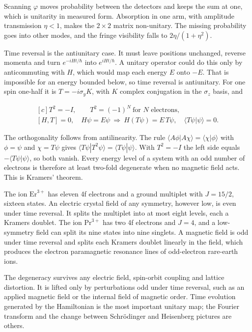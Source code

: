 \documentclass[11pt,oneside]{book}
\newenvironment{centeredalign}{\[\begin{gathered}[c]}{\end{gathered}\]}
\begin{document}
Scanning \(\varphi\) moves probability between the detectors and keeps the sum at one, which is unitarity in measured form. Absorption in one arm, with amplitude transmission \(\eta<1\), makes the \(2\times2\) matrix non-unitary. The missing probability goes into other modes, and the fringe visibility falls to \(2\eta/(1+\eta^2)\).

Time reversal is the antiunitary case. It must leave positions unchanged, reverse momenta and turn \(e^{-iHt/\hbar}\) into \(e^{iHt/\hbar}\). A unitary operator could do this only by anticommuting with \(H\), which would map each energy \(E\) onto \(-E\). That is impossible for an energy bounded below, so time reversal is antiunitary. For one spin one-half it is \(T=-i\sigma_yK\), with \(K\) complex conjugation in the \(\sigma_z\) basis, and

\begin{centeredalign}
T^2=-I,\qquad T^2=(-1)^N\ \text{for }N\text{ electrons},\\
[H,T]=0,\quad H\psi=E\psi\ \Longrightarrow\ H(T\psi)=E\,T\psi,\quad \langle T\psi|\psi\rangle=0.
\end{centeredalign}

The orthogonality follows from antilinearity. The rule \(\langle A\phi|A\chi\rangle=\langle\chi|\phi\rangle\) with \(\phi=\psi\) and \(\chi=T\psi\) gives \(\langle T\psi|T^2\psi\rangle=\langle T\psi|\psi\rangle\). With \(T^2=-I\) the left side equals \(-\langle T\psi|\psi\rangle\), so both vanish. Every energy level of a system with an odd number of electrons is therefore at least two-fold degenerate when no magnetic field acts. This is Kramers' theorem.

The ion \(\mathrm{Er}^{3+}\) has eleven 4f electrons and a ground multiplet with \(J=15/2\), sixteen states. An electric crystal field of any symmetry, however low, is even under time reversal. It splits the multiplet into at most eight levels, each a Kramers doublet. The ion \(\mathrm{Pr}^{3+}\) has two 4f electrons and \(J=4\), and a low-symmetry field can split its nine states into nine singlets. A magnetic field is odd under time reversal and splits each Kramers doublet linearly in the field, which produces the electron paramagnetic resonance lines of odd-electron rare-earth ions.

The degeneracy survives any electric field, spin-orbit coupling and lattice distortion. It is lifted only by perturbations odd under time reversal, such as an applied magnetic field or the internal field of magnetic order. Time evolution generated by the Hamiltonian is the most important unitary map; the Fourier transform and the change between Schrödinger and Heisenberg pictures are others.
\end{document}
